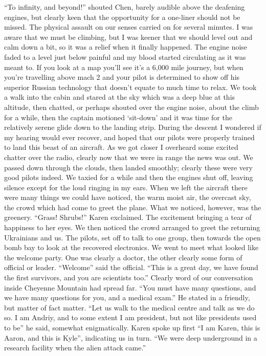 \documentclass[a4paper]{article}
\begin{document}
“To infinity, and beyond!” shouted Chen, barely audible above the deafening engines, but clearly keen that the opportunity for a one-liner should not be missed.
The physical assault on our senses carried on for several minutes. I was aware that we must be climbing, but I was keener that we should level out and calm down a bit, so it was a relief when it finally happened. The engine noise faded to a level just below painful and my blood started circulating as it was meant to.
If you look at a map you’ll see it’s a 6,000 mile journey, but when you’re travelling above mach 2 and your pilot is determined to show off his superior Russian technology that doesn’t equate to much time to relax. We took a walk into the cabin and stared at the sky which was a deep blue at this altitude, then chatted, or perhaps shouted over the engine noise, about the climb for a while, then the captain motioned ‘sit-down’ and it was time for the relatively serene glide down to the landing strip. During the descent I wondered if my hearing would ever recover, and hoped that our pilots were properly trained to land this beast of an aircraft. As we got closer I overheard some excited chatter over the radio, clearly now that we were in range the news was out. We passed down through the clouds, then landed smoothly; clearly these were very good pilots indeed. We taxied for a while and then the engines shut off, leaving silence except for the loud ringing in my ears.
When we left the aircraft there were many things we could have noticed, the warm moist air, the overcast sky, the crowd which had come to greet the plane. What we noticed, however, was the greenery.
“Grass! Shrubs!” Karen exclaimed. The excitement bringing a tear of happiness to her eyes. We then noticed the crowd arranged to greet the returning Ukrainians and us. The pilots, set off to talk to one group, then towards the open bomb bay to look at the recovered electronics. We went to meet what looked like the welcome party. One was clearly a doctor, the other clearly some form of official or leader.
“Welcome” said the official. “This is a great day, we have found the first survivors, and you are scientists too.” Clearly word of our conversation inside Cheyenne Mountain had spread far. “You must have many questions, and we have many questions for you, and a medical exam.” He stated in a friendly, but matter of fact matter. “Let us walk to the medical centre and talk as we do so. I am Andriy, and to some extent I am president, but not like presidents used to be” he said, somewhat enigmatically.
Karen spoke up first “I am Karen, this is Aaron, and this is Kyle”, indicating us in turn. “We were deep underground in a research facility when the alien attack came.”
\end{document}
